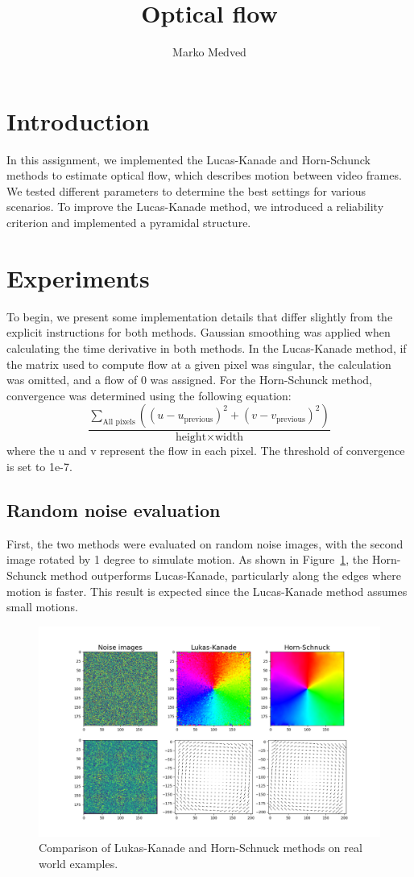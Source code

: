 \documentclass[9pt]{IEEEtran}
\title{\vspace{0ex}
Optical flow}
\author{Marko Medved\vspace{-4.0ex}}
\begin{document}
\maketitle

\section{Introduction}
In this assignment, we implemented the Lucas-Kanade and Horn-Schunck methods to estimate optical flow,
 which describes motion between video frames. We tested different parameters to determine the best settings
  for various scenarios. To improve the Lucas-Kanade method, we introduced a reliability criterion and 
  implemented a pyramidal structure.

\section{Experiments}
To begin, we present some implementation details that differ slightly from the explicit instructions
 for both methods. Gaussian smoothing was applied when calculating the time derivative in both methods.
In the Lucas-Kanade method, if the matrix used to compute flow at a given pixel was singular, the 
calculation was omitted, and a flow of 0 was assigned.
For the Horn-Schunck method, convergence was determined using the following equation: \[
\frac{\sum\limits_{\text{All pixels}} \left( (u - u_{\text{previous}})^2 + (v - v_{\text{previous}})^2 \right)}{\text{height} \times \text{width}}
\] where the u and v represent the flow in each pixel. The threshold of convergence is set 
to 1e-7. 


\subsection{Random noise evaluation}
First, the two methods were evaluated on random noise images, with the second image rotated by 1 degree 
to simulate motion. As shown in Figure~\ref{fig:LK_noise}, the Horn-Schunck method outperforms 
Lucas-Kanade, particularly along the edges where motion is faster. This result is expected since the 
Lucas-Kanade method assumes small motions.

\begin{figure}[h]
    \centering
    \includegraphics[width=0.8\columnwidth]{figures/noise.png}
    \caption{Comparison of Lukas-Kanade and Horn-Schnuck methods on real world examples.}
    \label{fig:LK_noise}
\end{figure}
\end{document}

